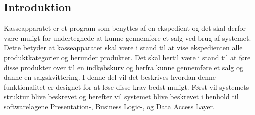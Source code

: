 \subsection{Introduktion}
Kasseapparatet er et program som benyttes af en ekspedient og det skal derfor være muligt for undertegnede at kunne gennemføre et salg ved brug af systemet. Dette betyder at kasseapparatet skal være i stand til at vise ekspedienten alle produktkategorier og herunder produkter. Det skal hertil være i stand til at føre disse produkter over til en indkøbskurv og herfra kunne gennemføre et salg og danne en salgskvittering. I denne del vil det beskrives hvordan denne funktionalitet er designet for at løse disse krav bedst muligt. Først vil systemets struktur blive beskrevet og herefter vil systemet blive beskrevet i henhold til softwarelagene Presentation-, Business Logic-, og Data Access Layer.\\

